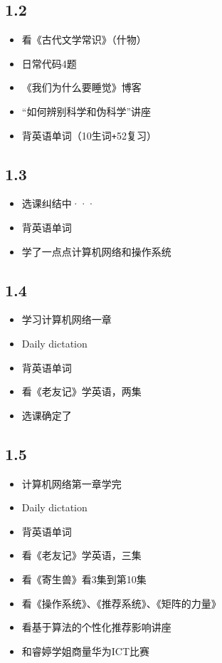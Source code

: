 \documentclass[UTF8]{ctexart}
\begin{document}
\subsection*{1.2}
\begin{itemize}
    \item 看《古代文学常识》（什物）
    \item 日常代码4题
    \item 《我们为什么要睡觉》博客
    \item “如何辨别科学和伪科学”讲座
    \item 背英语单词（10生词\verb|+|52复习）
\end{itemize}
\subsection*{1.3}
\begin{itemize}
    \item 选课纠结中···
    \item 背英语单词
    \item 学了一点点计算机网络和操作系统
\end{itemize}
\subsection*{1.4}
\begin{itemize}
    \item 学习计算机网络一章
    \item Daily dictation
    \item 背英语单词
    \item 看《老友记》学英语，两集
    \item 选课确定了
\end{itemize}
\subsection*{1.5}
\begin{itemize}
    \item 计算机网络第一章学完
    \item Daily dictation
    \item 背英语单词
    \item 看《老友记》学英语，三集
    \item 看《寄生兽》看3集到第10集
    \item 看《操作系统》、《推荐系统》、《矩阵的力量》
    \item 看基于算法的个性化推荐影响讲座
    \item 和睿婷学姐商量华为ICT比赛
\end{itemize}
\end{document}
